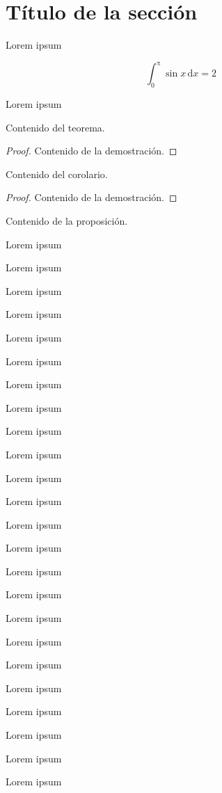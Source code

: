 \section{Título de la sección}
Lorem ipsum

\[
  \int_0^{\mathrm{\pi}} \sin x \, \mathrm{d}x = 2
\]

Lorem ipsum 

\begin{teorema}
    Contenido del teorema.
\end{teorema}

\begin{proof}
    Contenido de la demostración.
\end{proof}

\begin{corolario}
    Contenido del corolario.
\end{corolario}

\begin{proof}
    Contenido de la demostración.
\end{proof}

\begin{proposicion}
    Contenido de la proposición.
\end{proposicion}

Lorem ipsum 

Lorem ipsum 

Lorem ipsum 

Lorem ipsum 

Lorem ipsum 

Lorem ipsum 

Lorem ipsum 

Lorem ipsum 

Lorem ipsum 

Lorem ipsum 

Lorem ipsum 

Lorem ipsum 

Lorem ipsum 

Lorem ipsum 

Lorem ipsum 

Lorem ipsum 

Lorem ipsum 

Lorem ipsum 

Lorem ipsum 

Lorem ipsum 

Lorem ipsum 

Lorem ipsum 

Lorem ipsum 

Lorem ipsum 

